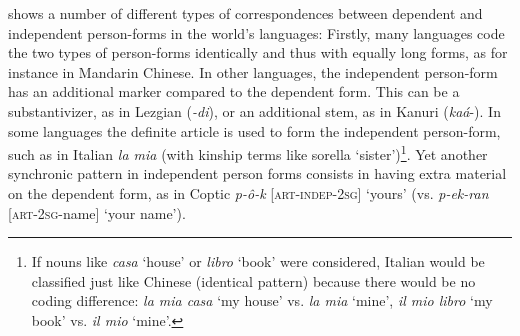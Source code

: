 \documentclass[output=paper]{langsci/langscibook}
\begin{document}
 shows a number of different types of correspondences between dependent and independent person-forms in the world's languages: Firstly, many languages code the two types of person-forms identically and thus with equally long forms, as for instance in Mandarin Chinese. In other languages, the independent person-form has an additional marker compared to the dependent form. This can be a substantivizer, as in Lezgian (\textit{{}-di}), or an additional stem, as in Kanuri (\textit{kaá}{}-). In some languages the definite article is used to form the independent person-form, such as in Italian \textit{la mia} (with kinship terms like sorella ‘sister’)\footnote{If nouns like \textit{casa} `house' or \textit{libro} `book' were considered, Italian would be classified just like Chinese (identical pattern) because there would be no coding difference: \textit{la mia casa} `my house' vs. \textit{la mia} `mine', \textit{il mio libro} `my book' vs. \textit{il mio} `mine'.}. Yet another synchronic pattern in independent person forms consists in having extra material on the dependent form, as in Coptic \textit{p-ô-k} [\textsc{art-indep-2sg}] `yours' (vs. \textit{p-ek-ran} [\textsc{art-2sg}{}-name] `your name').
\end{document}
